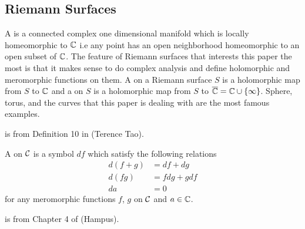 \subsection{Riemann Surfaces}

\begin{definition}\label{def:rs}
    A  is a connected complex one dimensional manifold which is locally homeomorphic to $\mathbb C$ i.e any point has an open neighborhood homeomorphic to an open subset of $\mathbb C$. The feature of Riemann surfaces that interests this paper the most is that it makes sense to do complex analysis and define holomorphic and meromorphic functions on them. A  on a Riemann surface $S$ is a holomorphic map from $S$ to $\mathbb C$ and a  on $S$ is a holomorphic map from $S$ to $\overline{\mathbb C}=\mathbb C\cup\{\infty\}$. Sphere, torus, and the curves that this paper is dealing with are the most famous examples.
\end{definition}

 is from Definition 10 in \cite{ref:terrytao} (Terence Tao).

\begin{definition}[differential]\label{def:differential}
    A  on $\mathcal C$ is a symbol $df$ which satisfy the following relations
    \begin{align*}
        d(f+g) &= df+dg\\
        d(fg) &= fdg+gdf\\
        da &= 0
    \end{align*}
    for any meromorphic functions $f$, $g$ on $\mathcal C$ and $a\in\mathbb C$.
\end{definition}

 is from Chapter 4 of \cite{ref:hampus} (Hampus).


